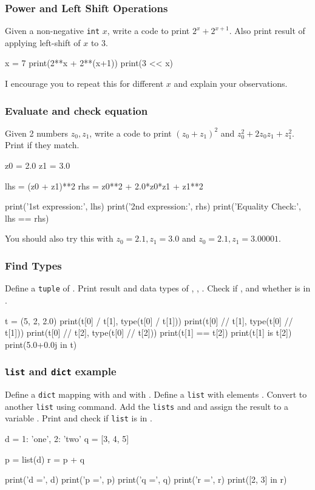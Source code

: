 \documentclass{beamer}
\begin{document}
\begin{frame}[fragile]
\frametitle{Power and Left Shift Operations}
Given a non-negative \lstinline{int} $x$, write a code to print $2^x+2^{x+1}$. Also print result of applying left-shift of $x$ to $3$.
\begin{python}
x = 7
print(2**x + 2**(x+1))
print(3 << x)
\end{python}
I encourage you to repeat this for different $x$ and explain your observations.
\end{frame}

\begin{frame}[fragile]
\frametitle{Evaluate and check equation}
Given 2 numbers $z_0, z_1$, write a code to print $(z_0+z_1)^2$ and $z_0^2+2z_0 z_1+z_1^2$. Print if they match.
\begin{python}
z0 = 2.0
z1 = 3.0

lhs = (z0 + z1)**2
rhs = z0**2 + 2.0*z0*z1 + z1**2

print('1st expression:', lhs)
print('2nd expression:', rhs)
print('Equality Check:', lhs == rhs)
\end{python}
You should also try this with $z_0=2.1, z_1=3.0$ and $z_0=2.1, z_1=3.00001$.
\end{frame}

\begin{frame}[fragile]
\frametitle{Find Types}
Define a \lstinline{tuple}  of . Print result and data types of , , . Check if ,  and whether  is in .
\begin{python}
t = (5, 2, 2.0)
print(t[0] / t[1], type(t[0] / t[1]))
print(t[0] // t[1], type(t[0] // t[1]))
print(t[0] // t[2], type(t[0] // t[2]))
print(t[1] == t[2])
print(t[1] is t[2])
print(5.0+0.0j in t)
\end{python}
\end{frame}

\begin{frame}[fragile]
\frametitle{\lstinline{list} and \lstinline{dict} example}
Define a \lstinline{dict}  mapping  with  and  with . Define a \lstinline{list}  with elements . Convert  to another \lstinline{list}  using  command. Add the \lstinline{lists}  and  and assign the result to a variable . Print  and check if \lstinline{list} \pyth{[2, 3]} is in .
\begin{python}
d = {1: 'one', 2: 'two'}
q = [3, 4, 5]

p = list(d)
r = p + q

print('d =', d)
print('p =', p)
print('q =', q)
print('r =', r)
print([2, 3] in r)
\end{python}
\end{frame}
\end{document}
